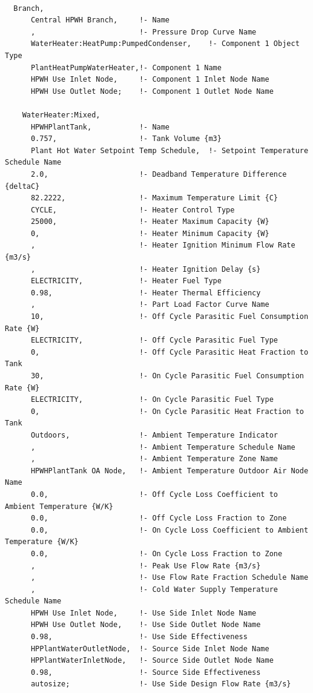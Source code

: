 \begin{lstlisting}

  Branch,
      Central HPWH Branch,     !- Name
      ,                        !- Pressure Drop Curve Name
      WaterHeater:HeatPump:PumpedCondenser,    !- Component 1 Object Type
      PlantHeatPumpWaterHeater,!- Component 1 Name
      HPWH Use Inlet Node,     !- Component 1 Inlet Node Name
      HPWH Use Outlet Node;    !- Component 1 Outlet Node Name

    WaterHeater:Mixed,
      HPWHPlantTank,           !- Name
      0.757,                   !- Tank Volume {m3}
      Plant Hot Water Setpoint Temp Schedule,  !- Setpoint Temperature Schedule Name
      2.0,                     !- Deadband Temperature Difference {deltaC}
      82.2222,                 !- Maximum Temperature Limit {C}
      CYCLE,                   !- Heater Control Type
      25000,                   !- Heater Maximum Capacity {W}
      0,                       !- Heater Minimum Capacity {W}
      ,                        !- Heater Ignition Minimum Flow Rate {m3/s}
      ,                        !- Heater Ignition Delay {s}
      ELECTRICITY,             !- Heater Fuel Type
      0.98,                    !- Heater Thermal Efficiency
      ,                        !- Part Load Factor Curve Name
      10,                      !- Off Cycle Parasitic Fuel Consumption Rate {W}
      ELECTRICITY,             !- Off Cycle Parasitic Fuel Type
      0,                       !- Off Cycle Parasitic Heat Fraction to Tank
      30,                      !- On Cycle Parasitic Fuel Consumption Rate {W}
      ELECTRICITY,             !- On Cycle Parasitic Fuel Type
      0,                       !- On Cycle Parasitic Heat Fraction to Tank
      Outdoors,                !- Ambient Temperature Indicator
      ,                        !- Ambient Temperature Schedule Name
      ,                        !- Ambient Temperature Zone Name
      HPWHPlantTank OA Node,   !- Ambient Temperature Outdoor Air Node Name
      0.0,                     !- Off Cycle Loss Coefficient to Ambient Temperature {W/K}
      0.0,                     !- Off Cycle Loss Fraction to Zone
      0.0,                     !- On Cycle Loss Coefficient to Ambient Temperature {W/K}
      0.0,                     !- On Cycle Loss Fraction to Zone
      ,                        !- Peak Use Flow Rate {m3/s}
      ,                        !- Use Flow Rate Fraction Schedule Name
      ,                        !- Cold Water Supply Temperature Schedule Name
      HPWH Use Inlet Node,     !- Use Side Inlet Node Name
      HPWH Use Outlet Node,    !- Use Side Outlet Node Name
      0.98,                    !- Use Side Effectiveness
      HPPlantWaterOutletNode,  !- Source Side Inlet Node Name
      HPPlantWaterInletNode,   !- Source Side Outlet Node Name
      0.98,                    !- Source Side Effectiveness
      autosize;                !- Use Side Design Flow Rate {m3/s}


\end{lstlisting}
